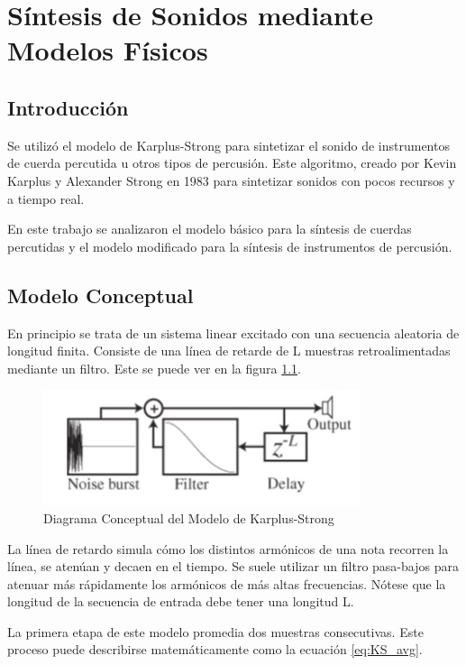 \chapter{Síntesis de Sonidos mediante Modelos Físicos}

\section{Introducción}
Se utilizó el modelo de Karplus-Strong para sintetizar el sonido de instrumentos de cuerda percutida u otros tipos de percusión. Este algoritmo, creado por Kevin Karplus y Alexander Strong en 1983 para sintetizar sonidos con pocos recursos y a tiempo real.

En este trabajo se analizaron el modelo básico para la síntesis de cuerdas percutidas y el modelo modificado para la síntesis de instrumentos de percusión.

\section{Modelo Conceptual}

En principio se trata de un sistema linear excitado con una secuencia aleatoria de longitud finita. Consiste de una línea de retarde de L muestras retroalimentadas mediante un filtro. Este se puede ver en la figura \ref{fig:KS_model}.

\begin{figure}[ht]
    \centering
    \includegraphics{res/ks_concept.jpg}
    \caption{Diagrama Conceptual del Modelo de Karplus-Strong}
    \label{fig:KS_model}
\end{figure}

La línea de retardo simula cómo los distintos armónicos de una nota recorren la línea, se atenúan y decaen en el tiempo. Se suele utilizar un filtro pasa-bajos para atenuar más rápidamente los armónicos de más altas frecuencias. Nótese que la longitud de la secuencia de entrada debe tener una longitud L.

La primera etapa de este modelo promedia dos muestras consecutivas. Este proceso puede describirse matemáticamente como la ecuación \eqref{eq:KS_avg}.

